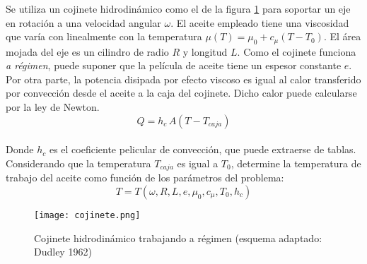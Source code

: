 \item Se utiliza un cojinete hidrodinámico como el de la figura \ref{fig:cojinete}
para soportar un eje en rotación a una velocidad angular $\omega$. El aceite empleado tiene una viscosidad que varía con linealmente con la temperatura
$\mu(T) = \mu_0 + c_\mu (T - T_0)$. El área mojada del eje es un cilindro
de radio $R$ y longitud $L$. Como el cojinete funciona
\textit{a régimen}, puede suponer que la película de aceite tiene un espesor
constante $e$.
\\
Por otra parte, la potencia disipada por efecto viscoso es igual al calor transferido
por convección desde el aceite a la caja del cojinete. Dicho calor puede calcularse
por la ley de Newton.
\begin{equation*}
Q = h_c\,A(T - T_{caja})
\end{equation*}
\\
Donde $h_c$ es el coeficiente pelicular de convección, que puede extraerse de tablas.
Considerando que la temperatura $T_{caja}$ es igual a $T_0$, determine la
temperatura de trabajo del aceite como función de los parámetros del problema:
\begin{equation*}
T = T(\omega, R, L, e, \mu_0, c_\mu, T_0, h_c)
\end{equation*}


\begin{figure}[h!!!!]
  \centering
  \texttt{[image: cojinete.png]}
  \caption{Cojinete hidrodinámico trabajando a régimen (esquema adaptado:
  Dudley 1962)}
  \label{fig:cojinete}
\end{figure}
